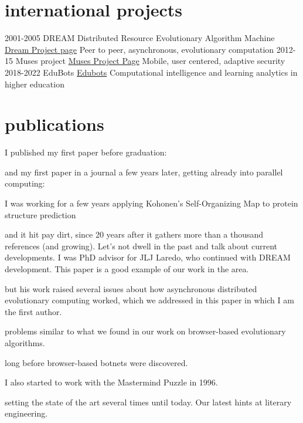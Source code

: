 \documentclass[]{friggeri-jj-cv}
\begin{document}
\section{international projects}

\begin{entrylist}
  \entry
    {2001-2005}
    {{\sf DREAM} Distributed Resource Evolutionary Algorithm Machine}
    {\href{http://www.soc.napier.ac.uk/~benp/dream/dream.htm}{Dream
        Project page}}
    {Peer to peer, asynchronous, evolutionary computation}
  \entry
    {2012-15}
    {Muses project}
    {\href{https://musesproject.eu/}{Muses Project Page}}
    {Mobile, user centered, adaptive security}
    \entry
    {2018-2022}
    {EduBots}
    {\href{https://edubots.eu}{Edubots}}
    {Computational intelligence and learning analytics in higher education}
\end{entrylist}

\section{publications}

I published my first paper before graduation:

\cite{merelo88}

and my first paper in a journal a few years later, getting already
into parallel computing:

\cite{parallel90}
I was working for a few years applying Kohonen's Self-Organizing Map to protein structure prediction

\cite{jjproteng}
and it hit pay dirt, since 20 years after it gathers more than a
thousand references (and growing). Let's not dwell in the past
and talk about current developments. I was PhD advisor for JLJ Laredo,
who continued with DREAM development. This paper is a good example of
our work in the area.

\cite{evag:gpem}
but his work raised several issues about how asynchronous distributed
evolutionary computing worked, which we addressed in this paper in
which I am the first author.

\cite{jj:2008:PPSN}
problems similar to what we found in our work on browser-based
evolutionary algorithms.

\cite{agajaj}
long before browser-based botnets were discovered.

I also started to work with the Mastermind Puzzle in 1996.

\cite{jj-ppsn96}
setting the state of the art several times until today. Our latest hints at
literary engineering.
\end{document}
